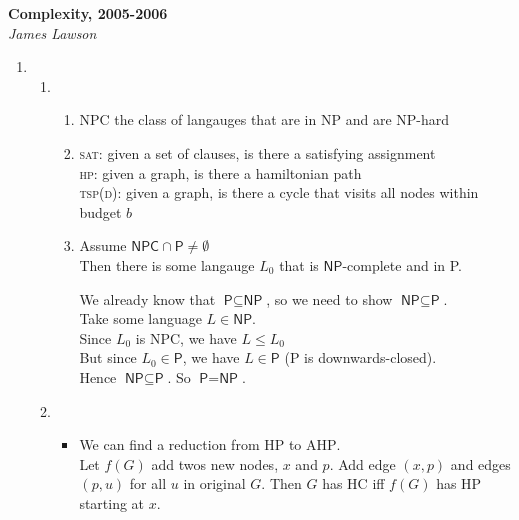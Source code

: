 \documentclass[a4paper, draft, 12pt]{article}
\begin{document}
\textbf{Complexity, 2005-2006}\\
\textit{James Lawson}

\begin{enumerate} 
\item %
\begin{enumerate}
\item %
  \begin{enumerate}
  \item %
  \textsf{NPC} the class of langauges that are in \textsf{NP} and are \textsf{NP}-hard
  \item %
  \textsc{sat}: given a set of clauses, is there a satisfying assignment\\
  \textsc{hp}: given a graph, is there a hamiltonian path\\
  \textsc{tsp(d)}: given a graph, is there a cycle that visits all nodes within budget $b$
  \item %
  Assume $\textsf{NPC} \cap \textsf{P} \neq \emptyset$ \\
  Then there is some langauge $L_0$ that is  $\textsf{NP}$-complete and in \textsf{P}. 

  We already know that $\textsf{P} \subseteq \textsf{NP}$, so we need to show $\textsf{NP} \subseteq \textsf{P}$.\\
  Take some language $L \in \textsf{NP}$. \\
  Since $L_0$ is \textsf{NPC}, we have $L \leqslant L_0$\\
  But since $L_0 \in \textsf{P}$, we have $L \in \textsf{P}$ (\textsf{P} is downwards-closed).\\
  Hence $\textsf{NP} \subseteq \textsf{P}$. So $\textsf{P} = \textsf{NP}$.
  \end{enumerate}

  \item %
  \begin{itemize}
  \item 
  We can find a reduction from \textsc{HP} to \textsc{AHP}. \\
  Let $f(G)$ add twos new nodes, $x$ and $p$. Add edge $(x,p)$ and edges $(p, u)$ for all $u$ in original $G$.
  Then $G$ has HC iff $f(G)$ has HP starting at $x$. 


\end{itemize}
\end{enumerate}
\end{enumerate}
\end{document}
